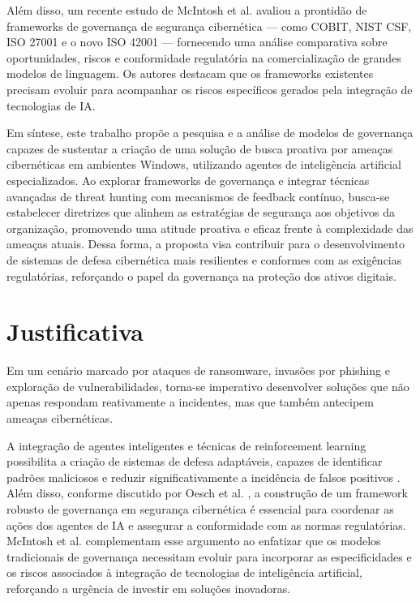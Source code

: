 \documentclass[article,12pt,a4paper]{abntex2}
\begin{document}
Além disso, um recente estudo de McIntosh et al. \cite{McIntosh2024} avaliou a prontidão de frameworks de governança de segurança cibernética — como COBIT, NIST CSF, ISO 27001 e o novo ISO 42001 — fornecendo uma análise comparativa sobre oportunidades, riscos e conformidade regulatória na comercialização de grandes modelos de linguagem. Os autores destacam que os frameworks existentes precisam evoluir para acompanhar os riscos específicos gerados pela integração de tecnologias de IA.

Em síntese, este trabalho propõe a pesquisa e a análise de modelos de governança capazes de sustentar a criação de uma solução de busca proativa por ameaças cibernéticas em ambientes Windows, utilizando agentes de inteligência artificial especializados. Ao explorar frameworks de governança e integrar técnicas avançadas de threat hunting com mecanismos de feedback contínuo, busca-se estabelecer diretrizes que alinhem as estratégias de segurança aos objetivos da organização, promovendo uma atitude proativa e eficaz frente à complexidade das ameaças atuais. Dessa forma, a proposta visa contribuir para o desenvolvimento de sistemas de defesa cibernética mais resilientes e conformes com as exigências regulatórias, reforçando o papel da governança na proteção dos ativos digitais.

\section{Justificativa}
Em um cenário marcado por ataques de ransomware, invasões por phishing e exploração de vulnerabilidades, torna-se imperativo desenvolver soluções que não apenas respondam reativamente a incidentes, mas que também antecipem ameaças cibernéticas.

A integração de agentes inteligentes e técnicas de reinforcement learning possibilita a criação de sistemas de defesa adaptáveis, capazes de identificar padrões maliciosos e reduzir significativamente a incidência de falsos positivos \cite{academia20}. Além disso, conforme discutido por Oesch et al. \cite{academia21}, a construção de um framework robusto de governança em segurança cibernética é essencial para coordenar as ações dos agentes de IA e assegurar a conformidade com as normas regulatórias. McIntosh et al. \cite{McIntosh2024} complementam esse argumento ao enfatizar que os modelos tradicionais de governança necessitam evoluir para incorporar as especificidades e os riscos associados à integração de tecnologias de inteligência artificial, reforçando a urgência de investir em soluções inovadoras.
\end{document}
